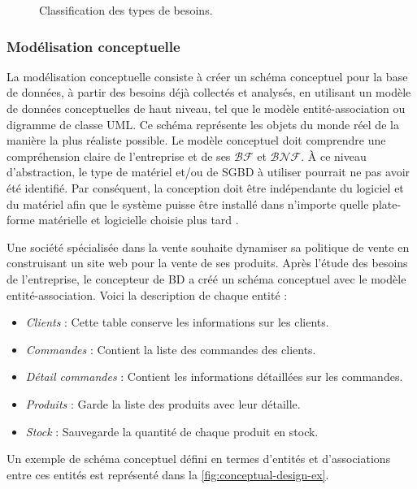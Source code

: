 \begin{figure}
\footnotesize
\begin{center}

\caption{Classification des types de besoins.}
\label{fig:reqs-classification}
\end{center}
\end{figure}



\subsubsection{Modélisation conceptuelle}
La modélisation conceptuelle consiste à créer un schéma conceptuel pour la base de données, à partir des besoins déjà collectés et analysés, en utilisant un modèle de données conceptuelles de haut niveau, tel que le modèle entité-association ou digramme de classe UML. Ce schéma représente les objets du monde réel de la manière la plus réaliste possible. Le modèle conceptuel doit comprendre une compréhension claire de l'entreprise et de ses $\mathcal{BF}$ et $\mathcal{BNF}$. À ce niveau d'abstraction, le type de matériel et/ou de SGBD à utiliser pourrait ne pas avoir été identifié. Par conséquent, la conception doit être indépendante du logiciel et du matériel afin que le système puisse être installé dans n'importe quelle plate-forme matérielle et logicielle choisie plus tard \cite{Coronel09}.

\begin{example}
 Une société spécialisée dans la vente souhaite dynamiser sa politique de vente en construisant un site web pour la vente de ses produits. Après l'étude des besoins de l'entreprise, le concepteur de BD a créé un schéma conceptuel avec le modèle entité-association. Voici la description de chaque entité :
 \begin{itemize}
  \item \textit{Clients} : Cette table conserve les informations sur les clients.
  \item \textit{Commandes} : Contient la liste des commandes des clients.
  \item \textit{Détail commandes} : Contient les informations détaillées sur les commandes.
  \item \textit{Produits} : Garde la liste des produits avec leur détaille.
  \item \textit{Stock} : Sauvegarde la quantité de chaque produit en stock.
 \end{itemize}
 Un exemple de schéma conceptuel défini en termes d'entités et d'associations entre ces entités est représenté dans la \ref{fig:conceptual-design-ex}.
\end{example}

